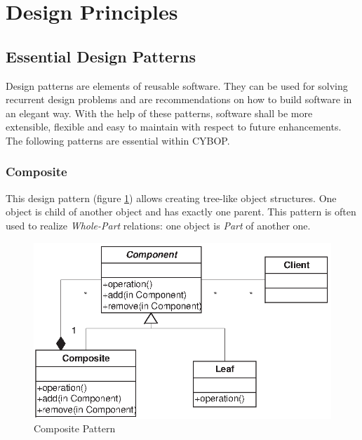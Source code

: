 %
%
%
%
%
%
%

\section{Design Principles}
\label{design_principles_heading}

\subsection{Essential Design Patterns}
\label{essential_design_patterns_heading}

Design patterns \cite{gamma1995} are elements of reusable software. They can be
used for solving recurrent design problems and are recommendations on how to build
software in an elegant way. With the help of these patterns, software shall be
more extensible, flexible and easy to maintain with respect to future enhancements.
The following patterns are essential within CYBOP.

\subsubsection{Composite}
\label{composite_heading}

This design pattern (figure \ref{composite_figure}) allows creating tree-like
object structures. One object is child of another object and has exactly one
parent. This pattern is often used to realize \emph{Whole-Part} relations:
one object is \emph{Part} of another one.

\begin{figure}[ht]
    \begin{center}
       \includegraphics[scale=0.7]{eps/compositum.eps}
       \caption{Composite Pattern}
       \label{composite_figure}
    \end{center}
\end{figure}

